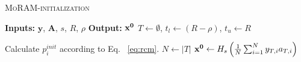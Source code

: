 \begin{algorithm}[t]
	\caption{\textsc{MoRAM-initialization}}
	\label{alg:RCM}
	\begin{algorithmic}
		\State\textbf{Inputs:} $\mathbf{y}$, $\mathbf{A}$, $s$, $R$, $\rho$
		\State\textbf{Output:}  $\mathbf{x^0}$
		\State $T \leftarrow \emptyset$, $t_l \leftarrow (R-\rho)$, $t_u \leftarrow R$
%		
		
		\EndIf
		\State Calculate $p^{init}_i$ according to Eq. ~\ref{eq:rcm}.
		\EndFor
		\State $N \leftarrow |T|$
		\State $\mathbf{x^0} \leftarrow H_s\left( \frac{1}{N}\sum_{i=1}^{N}y_{T,i}a_{T,i}\right)$
	\end{algorithmic}
\end{algorithm}




